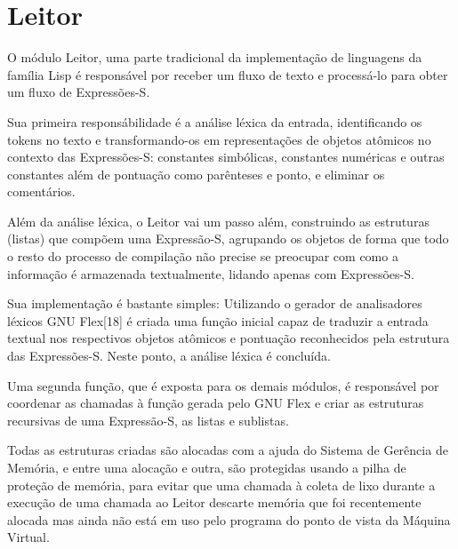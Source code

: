 \section{Leitor}
\label{sec:leitor}

O módulo Leitor, uma parte tradicional da implementação de linguagens da família Lisp é responsável por receber um fluxo de texto e processá-lo para obter um fluxo de Expressões-S.

Sua primeira responsábilidade é a análise léxica da entrada, identificando os tokens no texto e transformando-os em representações de objetos atômicos no contexto das Expressões-S: constantes simbólicas, constantes numéricas e outras constantes além de pontuação como parênteses e ponto, e eliminar os comentários. 

Além da análise léxica, o Leitor vai um passo além, construindo as estruturas (listas) que compõem uma Expressão-S, agrupando os objetos de forma que todo o resto do processo de compilação não precise se preocupar com como a informação é armazenada textualmente, lidando apenas com Expressões-S.

Sua implementação é bastante simples: Utilizando o gerador de analisadores léxicos GNU Flex[18] é criada uma função inicial capaz de traduzir a entrada textual nos respectivos objetos atômicos e pontuação reconhecidos pela estrutura das Expressões-S. Neste ponto, a análise léxica é concluída. 

Uma segunda função, que é exposta para os demais módulos, é responsável por coordenar as chamadas à função gerada pelo GNU Flex e criar as estruturas recursivas de uma Expressão-S, as listas e sublistas.

Todas as estruturas criadas são alocadas com a ajuda do Sistema de Gerência de Memória, e entre uma alocação e outra, são protegidas usando a pilha de proteção de memória, para evitar que uma chamada à coleta de lixo durante a execução de uma chamada ao Leitor descarte memória que foi recentemente alocada mas ainda não está em uso pelo programa do ponto de vista da Máquina Virtual.




